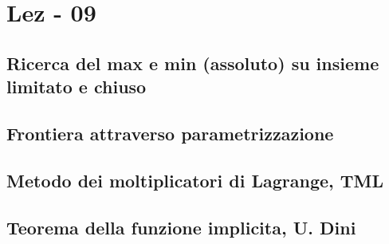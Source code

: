 \section{Lez - 09}
\subsection{Ricerca del max e min (assoluto) su insieme limitato e chiuso}
\subsection{Frontiera attraverso parametrizzazione}
\subsection{Metodo dei moltiplicatori di Lagrange, TML}
\subsection{Teorema della funzione implicita, U. Dini}
